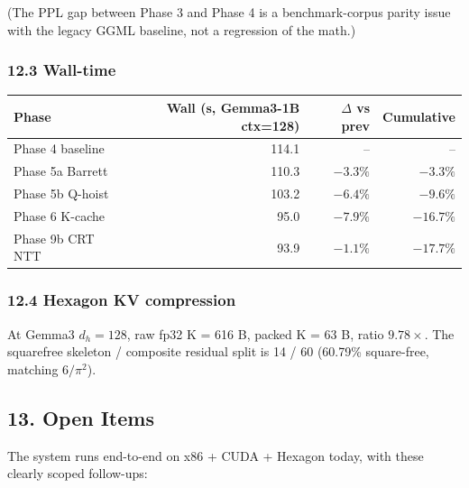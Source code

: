 \documentclass[
  11pt,
]{article}
\begin{document}
(The PPL gap between Phase 3 and Phase 4 is a benchmark-corpus parity
issue with the legacy GGML baseline, not a regression of the math.)

\hypertarget{wall-time}{%
\subsubsection{12.3 Wall-time}\label{wall-time}}

\begin{longtable}[]{@{}lrrr@{}}
\toprule
Phase & Wall (s, Gemma3-1B ctx=128) & \(\Delta\) vs prev &
Cumulative\tabularnewline
\midrule
\endhead
Phase 4 baseline & 114.1 & -- & --\tabularnewline
Phase 5a Barrett & 110.3 & \(-3.3\%\) & \(-3.3\%\)\tabularnewline
Phase 5b Q-hoist & 103.2 & \(-6.4\%\) & \(-9.6\%\)\tabularnewline
Phase 6 K-cache & 95.0 & \(-7.9\%\) & \(-16.7\%\)\tabularnewline
Phase 9b CRT NTT & 93.9 & \(-1.1\%\) & \(-17.7\%\)\tabularnewline
\bottomrule
\end{longtable}

\hypertarget{hexagon-kv-compression}{%
\subsubsection{12.4 Hexagon KV
compression}\label{hexagon-kv-compression}}

At Gemma3 \(d_h = 128\), raw fp32 K = 616 B, packed K = 63 B, ratio
\(9.78\times\). The squarefree skeleton / composite residual split is 14
/ 60 (60.79\% square-free, matching \(6/\pi^2\)).

\hypertarget{open-items}{%
\subsection{13. Open Items}\label{open-items}}

The system runs end-to-end on x86 + CUDA + Hexagon today, with these
clearly scoped follow-ups:
\end{document}
